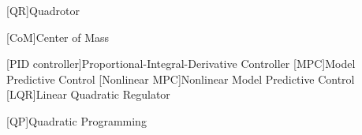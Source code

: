 
\begin{acronym}[\hspace{0.8in}] %


%	

%
%
%	

%	
%	
%
%	
%
%	
%	
%	

	[QR]{Quadrotor}

	[CoM]{Center of Mass}
	
	[PID controller]{Proportional-Integral-Derivative Controller}
	[MPC]{Model Predictive Control}
	[Nonlinear MPC]{Nonlinear Model Predictive Control}
	[LQR]{Linear Quadratic Regulator}
	
	[QP]{Quadratic Programming}


\end{acronym}